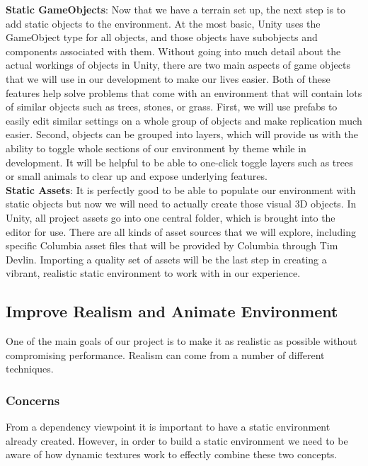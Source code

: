 \documentclass[10pt,journal,compsoc,onecolumn, draftclsnofoot]{IEEEtran}
\begin{document}
\hangindent=0.5cm \textbf{Static GameObjects}: Now that we have a terrain set up,
the next step is to add static objects to the environment. At the most basic, Unity
uses the GameObject type for all objects, and those objects have subobjects and
components associated with them. \cite{ray} Without going into much detail about the
actual workings of objects in Unity, there are two main aspects of game objects that
we will use in our development to make our lives easier. Both of these features help
solve problems that come with an environment that will contain lots of similar
objects such as trees, stones, or grass. First, we will use prefabs to easily
edit similar settings on a whole group of objects and make replication much
easier. \cite{ray} Second, objects can be grouped into layers, which will
provide us with the ability to toggle whole sections of our environment by
theme while in development. \cite{layers_video} It will be helpful to be able
to one-click toggle layers such as trees or small animals to clear up and
expose underlying features.\\

\hangindent=0.5cm \textbf{Static Assets}: It is perfectly good to be able to populate our environment with static objects but now we will need to actually create those visual 3D objects. In Unity, all project assets go into one central folder, which is brought into the editor for use. \cite{unity_importing_assets} There are all kinds of asset sources that we will explore, including specific Columbia asset files that will be provided by Columbia through Tim Devlin. Importing a quality set of assets will be the last step in creating a vibrant, realistic static environment to work with in our experience.\\

\subsection{Improve Realism and Animate Environment}
One of the main goals of our project is to make it as realistic as possible
without compromising performance. Realism can come from a number of different
techniques.
\subsubsection{Concerns}
From a dependency viewpoint it is important to have a static environment already created. However, in order to build a static environment we need to be aware of how dynamic textures work to effectly combine these two concepts.
\end{document}
